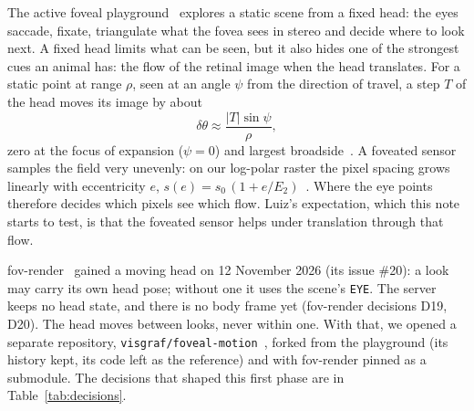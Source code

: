 \documentclass[11pt,a4paper]{article}
\newcommand{\code}[1]{\texttt{\small #1}}
\begin{document}
The active foveal playground~\cite{playground,tr11} explores a static scene from a fixed head: the eyes saccade, fixate,
triangulate what the fovea sees in stereo and decide where to look next. A fixed head limits what can be seen, but it
also hides one of the strongest cues an animal has: the flow of the retinal image when the head translates. For a static
point at range $\rho$, seen at an angle $\psi$ from the direction of travel, a step $T$ of the head moves its image by
about
\begin{equation}\label{eq:flow}
  \delta\theta \approx \frac{|T|\sin\psi}{\rho},
\end{equation}
zero at the focus of expansion ($\psi=0$) and largest broadside~\cite{lhp}. A foveated sensor samples the field very
unevenly: on our log-polar raster the pixel spacing grows linearly with eccentricity $e$,
$s(e)=s_0\,(1+e/E_2)$~\cite{schwartz,fovrendertr}. Where the eye points therefore decides which pixels see which flow.
Luiz's expectation, which this note starts to test, is that the foveated sensor helps under translation through that
flow.

fov-render~\cite{fovrender,fovrendertr} gained a moving head on 12 November 2026 (its issue \#20): a look may carry its own
head pose; without one it uses the scene's \code{EYE}. The server keeps no head state, and there is no body frame yet
(fov-render decisions D19, D20). The head moves between looks, never within one. With that, we opened a separate
repository, \code{visgraf/foveal-motion}~\cite{fm}, forked from the playground (its history kept, its code left as the
reference) and with fov-render pinned as a submodule. The decisions that shaped this first phase are in
Table~\ref{tab:decisions}.
\end{document}
